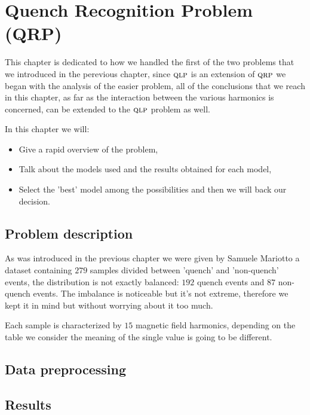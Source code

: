 \chapter{Quench Recognition Problem (QRP)}
\label{chp:qrp}
This chapter is dedicated to how we handled the first of the two problems that we introduced in the
perevious chapter, since $\textsc{qlp}$ is an extension of $\textsc{qrp}$ we began with the analysis of the easier
problem, all of the conclusions that we reach in this chapter, as far as the interaction between the
various harmonics is concerned, can be extended to the $\textsc{qlp}$ problem as well.

In this chapter we will:
\begin{itemize}
	\item Give a rapid overview of the problem,
	\item Talk about the models used and the results obtained for each model,
	\item Select the 'best' model among the possibilities and then we will back our decision.
\end{itemize}

\section{Problem description}
As was introduced in the previous chapter we were given by Samuele Mariotto a dataset containing
$279$ samples divided between 'quench' and 'non-quench' events, the distribution is not exactly
balanced: $192$ quench events and $87$ non-quench events. The imbalance is noticeable but it's not
extreme, therefore we kept it in mind but without worrying about it too much.

Each sample is characterized by $15$ magnetic field harmonics, depending on the table we consider
the meaning of the single value is going to be different.

\section{Data preprocessing}

\section{Results}
